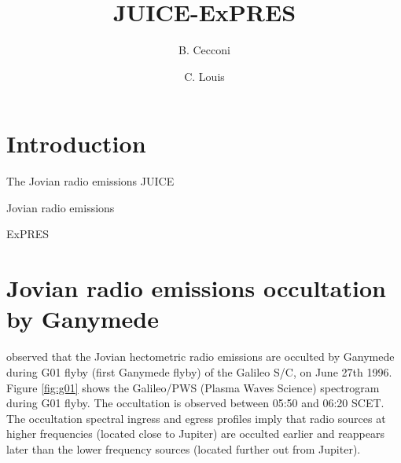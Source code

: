 \documentclass[referee]{aa}
\begin{document}
 


   \title{JUICE-ExPRES}

   \subtitle{}

   \author{B. Cecconi
          \and
          C. Louis
          }


   \date{}

 
  \abstract
   {}
   {}
   {}
   {}
   {}


   \maketitle
%

\section{Introduction}

The Jovian radio emissions
JUICE 

Jovian radio emissions

ExPRES \citep{Louis_AA_2019}   


\section{Jovian radio emissions occultation by Ganymede}
\citet{kurth_GRL_97} observed that the Jovian hectometric radio emissions are occulted by Ganymede during G01 flyby (first Ganymede flyby) of the Galileo S/C, on June 27th 1996. Figure \ref{fig:g01} shows the Galileo/PWS (Plasma Waves Science) \citep{gurnett_SSR_92} spectrogram during G01 flyby. The occultation is observed between 05:50 and 06:20 SCET. The occultation spectral ingress and egress profiles imply that radio sources at higher frequencies (located close to Jupiter) are occulted earlier and reappears later than the lower frequency sources (located further out from Jupiter).
\end{document}
